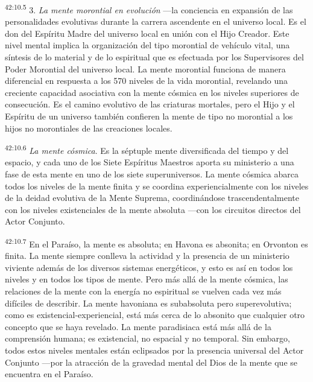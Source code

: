\par
\textsuperscript{42:10.5} 3. \textit{La mente morontial en evolución} ---la conciencia en expansión de las personalidades evolutivas durante la carrera ascendente en el universo local. Es el don del Espíritu Madre del universo local en unión con el Hijo Creador. Este nivel mental implica la organización del tipo morontial de vehículo vital, una síntesis de lo material y de lo espiritual que es efectuada por los Supervisores del Poder Morontial del universo local. La mente morontial funciona de manera diferencial en respuesta a los 570 niveles de la vida morontial, revelando una creciente capacidad asociativa con la mente cósmica en los niveles superiores de consecución. Es el camino evolutivo de las criaturas mortales, pero el Hijo y el Espíritu de un universo también confieren la mente de tipo no morontial a los hijos no morontiales de las creaciones locales.

\par
\textsuperscript{42:10.6} \textit{La mente cósmica}. Es la séptuple mente diversificada del tiempo y del espacio, y cada uno de los Siete Espíritus Maestros aporta su ministerio a una fase de esta mente en uno de los siete superuniversos. La mente cósmica abarca todos los niveles de la mente finita y se coordina experiencialmente con los niveles de la deidad evolutiva de la Mente Suprema, coordinándose trascendentalmente con los niveles existenciales de la mente absoluta ---con los circuitos directos del Actor Conjunto.

\par
\textsuperscript{42:10.7} En el Paraíso, la mente es absoluta; en Havona es absonita; en Orvonton es finita. La mente siempre conlleva la actividad y la presencia de un ministerio viviente además de los diversos sistemas energéticos, y esto es así en todos los niveles y en todos los tipos de mente. Pero más allá de la mente cósmica, las relaciones de la mente con la energía no espiritual se vuelven cada vez más difíciles de describir. La mente havoniana es subabsoluta pero superevolutiva; como es existencial-experiencial, está más cerca de lo absonito que cualquier otro concepto que se haya revelado. La mente paradisiaca está más allá de la comprensión humana; es existencial, no espacial y no temporal. Sin embargo, todos estos niveles mentales están eclipsados por la presencia universal del Actor Conjunto ---por la atracción de la gravedad mental del Dios de la mente que se encuentra en el Paraíso.

